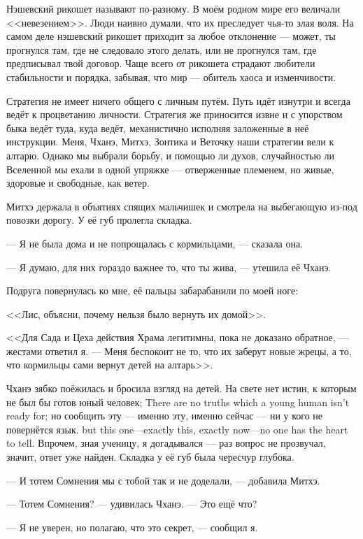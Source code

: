 Нэшевский рикошет называют по-разному.
В моём родном мире его величали <<невезением>>.
Люди наивно думали, что их преследует чья-то злая воля.
На самом деле нэшевский рикошет приходит за любое отклонение --- может, ты прогнулся там, где не следовало этого делать, или не прогнулся там, где предписывал твой договор.
Чаще всего от рикошета страдают любители стабильности и порядка, забывая, что мир --- обитель хаоса и изменчивости.

Стратегия не имеет ничего общего с личным путём.
Путь идёт изнутри и всегда ведёт к процветанию личности.
Стратегия же приносится извне и с упорством быка ведёт туда, куда ведёт, механистично исполняя заложенные в неё инструкции.
Меня, Чханэ, Митхэ, Зонтика и Веточку наши стратегии вели к алтарю.
Однако мы выбрали борьбу, и помощью ли духов, случайностью ли Вселенной мы ехали в одной упряжке --- отверженные племенем, но живые, здоровые и свободные, как ветер.

Митхэ держала в объятиях спящих мальчишек и смотрела на выбегающую из-под повозки дорогу.
У её губ пролегла складка.

--- Я не была дома и не попрощалась с кормильцами, --- сказала она.

--- Я думаю, для них гораздо важнее то, что ты жива, --- утешила её Чханэ.

Подруга повернулась ко мне, её пальцы забарабанили по моей ноге:

<<Лис, объясни, почему нельзя было вернуть их домой>>.

<<Для Сада и Цеха действия Храма легитимны, пока не доказано обратное, --- жестами ответил я.
--- Меня беспокоит не то, что их заберут новые жрецы, а то, что кормильцы сами вернут детей на алтарь>>.

Чханэ зябко поёжилась и бросила взгляд на детей.
{На свете нет истин, к которым не был бы готов юный человек;}
{There are no truths which a young human isn't ready for;}
{но сообщить эту --- именно эту, именно сейчас --- ни у кого не повернётся язык.}
{but this one---exactly this, exactly now---no one has the heart to tell.}
Впрочем, зная ученицу, я догадывался --- раз вопрос не прозвучал, значит, ответ уже найден.
Складка у её губ была чересчур глубока.

--- И тотем Сомнения мы с тобой так и не доделали, --- добавила Митхэ.

--- Тотем Сомнения? --- удивилась Чханэ.
--- Это ещё что?

--- Я не уверен, но полагаю, что это секрет, --- сообщил я.

